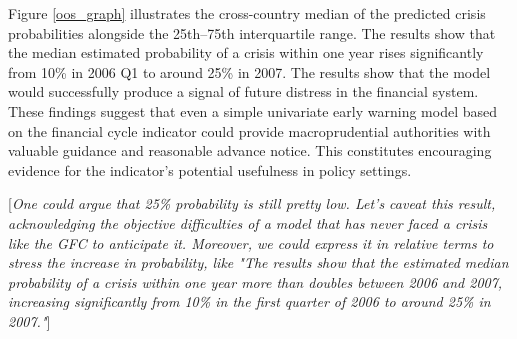 Figure \ref{oos_graph} illustrates the cross-country median of the predicted crisis probabilities alongside the 25th–75th interquartile range. The results show that the median estimated probability of a crisis within one year rises significantly from 10\% in 2006 Q1 to around 25\% in 2007. The results show that the model would successfully produce a signal of future distress in the financial system. These findings suggest that even a simple univariate early warning model based on the financial cycle indicator could provide macroprudential authorities with valuable guidance and reasonable advance notice. This constitutes encouraging evidence for the indicator’s potential usefulness in policy settings.

{\color{blue}[\textit{One could argue that 25\% probability is still pretty low. Let's caveat this result, acknowledging the objective difficulties of a model that has never faced a crisis like the GFC to anticipate it. Moreover, we could express it in relative terms to stress the increase in probability, like "The results show that the estimated median probability of a crisis within one year more than doubles between 2006 and 2007, increasing significantly from 10\% in the first quarter of 2006 to around 25\% in 2007."}]}
